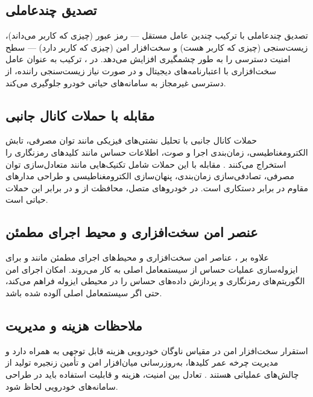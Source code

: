 \documentclass[12pt,a4paper]{article}
\begin{document}
\subsection{تصدیق چندعاملی}
تصدیق چندعاملی با ترکیب چندین عامل مستقل — رمز عبور (چیزی که کاربر می‌داند)، زیست‌سنجی (چیزی که کاربر هست) و سخت‌افزار امن (چیزی که کاربر دارد) — سطح امنیت دسترسی را به طور چشمگیری افزایش می‌دهد. در ، ترکیب  به عنوان عامل سخت‌افزاری با اعتبارنامه‌های دیجیتال و در صورت نیاز زیست‌سنجی راننده، از دسترسی غیرمجاز به سامانه‌های حیاتی خودرو جلوگیری می‌کند.

\subsection{مقابله با حملات کانال جانبی}
حملات کانال جانبی با تحلیل نشتی‌های فیزیکی مانند توان مصرفی، تابش الکترومغناطیسی، زمان‌بندی اجرا و صوت، اطلاعات حساس مانند کلیدهای رمزنگاری را استخراج می‌کنند \cite{farsimadanReviewSecurityChallenges2025}. مقابله با این حملات شامل تکنیک‌هایی مانند متعادل‌سازی توان مصرفی، تصادفی‌سازی زمان‌بندی، پنهان‌سازی الکترومغناطیسی و طراحی مدارهای مقاوم در برابر دستکاری است. در خودروهای متصل، محافظت از  و  در برابر این حملات حیاتی است.

\subsection{عنصر امن سخت‌افزاری و محیط اجرای مطمئن}
علاوه بر ، عناصر امن سخت‌افزاری و محیط‌های اجرای مطمئن مانند  و  برای ایزوله‌سازی عملیات حساس از سیستمعامل اصلی به کار می‌روند.  امکان اجرای امن الگوریتم‌های رمزنگاری و پردازش داده‌های حساس را در محیطی ایزوله فراهم می‌کند، حتی اگر سیستمعامل اصلی آلوده شده باشد.

\subsection{ملاحظات هزینه و مدیریت}
استقرار سخت‌افزار امن در مقیاس ناوگان خودرویی هزینه قابل توجهی به همراه دارد و مدیریت چرخه عمر کلیدها، به‌روزرسانی میان‌افزار امن و تأمین زنجیره تولید از چالش‌های عملیاتی هستند \cite{rahmawatiagustinaSystematicLiteratureReview2025}. تعادل بین امنیت، هزینه و قابلیت استفاده باید در طراحی سامانه‌های خودرویی لحاظ شود.


\end{document}
